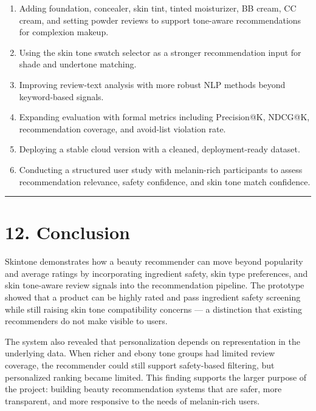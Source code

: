 \documentclass[
  letterpaper,
  DIV=11,
  numbers=noendperiod]{scrartcl}
\begin{document}
\begin{enumerate}
\def\labelenumi{\arabic{enumi}.}
\item
  Adding foundation, concealer, skin tint, tinted moisturizer, BB cream,
  CC cream, and setting powder reviews to support tone-aware
  recommendations for complexion makeup.
\item
  Using the skin tone swatch selector as a stronger recommendation input
  for shade and undertone matching.
\item
  Improving review-text analysis with more robust NLP methods beyond
  keyword-based signals.
\item
  Expanding evaluation with formal metrics including Precision@K,
  NDCG@K, recommendation coverage, and avoid-list violation rate.
\item
  Deploying a stable cloud version with a cleaned, deployment-ready
  dataset.
\item
  Conducting a structured user study with melanin-rich participants to
  assess recommendation relevance, safety confidence, and skin tone
  match confidence.
\end{enumerate}

\begin{center}\rule{0.5\linewidth}{0.5pt}\end{center}

\section{12. Conclusion}\label{conclusion}

Skintone demonstrates how a beauty recommender can move beyond
popularity and average ratings by incorporating ingredient safety, skin
type preferences, and skin tone-aware review signals into the
recommendation pipeline. The prototype showed that a product can be
highly rated and pass ingredient safety screening while still raising
skin tone compatibility concerns --- a distinction that existing
recommenders do not make visible to users.

The system also revealed that personalization depends on representation
in the underlying data. When richer and ebony tone groups had limited
review coverage, the recommender could still support safety-based
filtering, but personalized ranking became limited. This finding
supports the larger purpose of the project: building beauty
recommendation systems that are safer, more transparent, and more
responsive to the needs of melanin-rich users.
\end{document}
